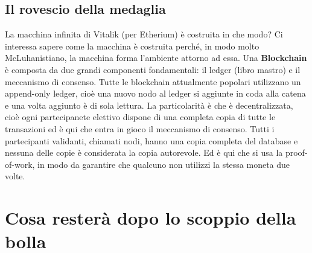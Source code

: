     \subsection{Il rovescio della medaglia}

    La macchina infinita di Vitalik (per Etherium) è costruita in che modo?
    Ci interessa sapere come la macchina è costruita perché, in modo molto McLuhanistiano, la macchina forma l'ambiente attorno ad essa. 
    Una \textbf{Blockchain} è composta da due grandi componenti fondamentali: il ledger (libro mastro) e il meccanismo di consenso. 
    Tutte le blockchain attualmente popolari utilizzano un append-only ledger, cioè una nuovo nodo al ledger si aggiunte in coda alla catena e una volta aggiunto è di sola lettura.
    La particolarità è che è decentralizzata, cioè ogni partecipanete elettivo dispone di una completa copia di tutte le transazioni ed è qui che entra in gioco il meccanismo di consenso.
    Tutti i partecipanti validanti, chiamati nodi, hanno una copia completa del database e nessuna delle copie è considerata la copia autorevole.
    Ed è qui che si usa la proof-of-work, in modo da garantire che qualcuno non utilizzi la stessa moneta due volte.


    \section{Cosa resterà dopo lo scoppio della bolla}